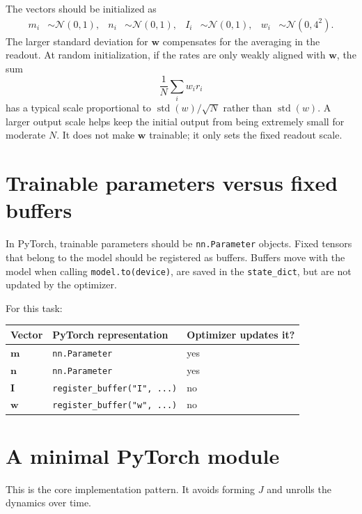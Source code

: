 \documentclass[11pt]{article}
\newcommand{\vm}{\mathbf{m}}
\newcommand{\vn}{\mathbf{n}}
\newcommand{\vI}{\mathbf{I}}
\newcommand{\vw}{\mathbf{w}}
\begin{document}
The vectors should be initialized as
\begin{align}
  m_i &\sim \mathcal{N}(0,1), &
  n_i &\sim \mathcal{N}(0,1), &
  I_i &\sim \mathcal{N}(0,1), &
  w_i &\sim \mathcal{N}(0,4^2).
\end{align}
The larger standard deviation for $\vw$ compensates for the averaging in the
readout. At random initialization, if the rates are only weakly aligned with
$\vw$, the sum
\[
  \frac{1}{N}\sum_i w_i r_i
\]
has a typical scale proportional to $\operatorname{std}(w)/\sqrt{N}$ rather than
$\operatorname{std}(w)$. A larger output scale helps keep the initial output from
being extremely small for moderate $N$. It does not make $\vw$ trainable; it only
sets the fixed readout scale.

\section{Trainable parameters versus fixed buffers}

In PyTorch, trainable parameters should be \texttt{nn.Parameter} objects. Fixed
tensors that belong to the model should be registered as buffers. Buffers move
with the model when calling \texttt{model.to(device)}, are saved in the
\texttt{state\_dict}, but are not updated by the optimizer.

For this task:
\begin{center}
\begin{tabular}{@{}lll@{}}
\toprule
Vector & PyTorch representation & Optimizer updates it? \\
\midrule
$\vm$ & \texttt{nn.Parameter} & yes \\
$\vn$ & \texttt{nn.Parameter} & yes \\
$\vI$ & \texttt{register\_buffer("I", ...)} & no \\
$\vw$ & \texttt{register\_buffer("w", ...)} & no \\
\bottomrule
\end{tabular}
\end{center}

\section{A minimal PyTorch module}

This is the core implementation pattern. It avoids forming $J$ and unrolls the
dynamics over time.
\end{document}
